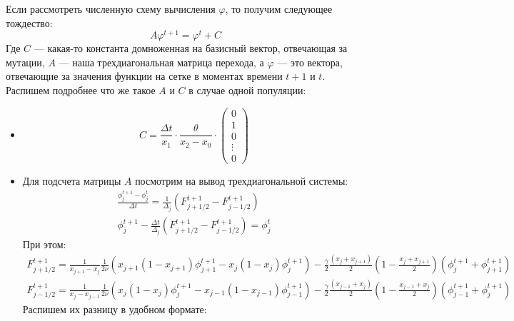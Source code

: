 \documentclass[10pt]{article}
\theoremstyle{plain}
\theoremstyle{remark}
\begin{document}
\begin{itemize}
  Если рассмотреть численную схему вычисления $\varphi$, то получим следующее тождество:
  \begin{equation*}
    A \varphi^{t + 1} = \varphi^t + C
  \end{equation*}
  Где $C$ --- какая-то константа домноженная на базисный вектор, отвечающая за мутации, $A$ --- наша трехдиагональная матрица перехода, а $\varphi$ --- это 
  вектора, отвечающие за значения функции на сетке в моментах времени $t + 1$ и $t$. Распишем подробнее что же такое $A$ и $C$ в случае одной популяции:
  \begin{itemize}
    \item
    \begin{equation*}
      C = \frac{\Delta t}{x_1} \cdot \frac{\theta}{x_2 - x_0} \cdot 
      \begin{pmatrix*}
        0 \\
        1 \\
        0 \\
        \vdots \\
        0
      \end{pmatrix*}
    \end{equation*}
    \item Для подсчета матрицы $A$ посмотрим на вывод трехдиагональной системы:
    \begin{gather*}
      \frac{\phi^{t + 1}_j - \phi^t_j}{\Delta t} = \frac{1}{\Delta_j}\left(F^{t + 1}_{j + 1/2} - F^{t + 1}_{j - 1/2}\right) \\ 
      \phi_j^{t + 1} - \frac{\Delta t}{\Delta_j} \left(F^{t + 1}_{j + 1/2} - F^{t + 1}_{j - 1/2}\right) = \phi_j^t
    \end{gather*}
    При этом:
    \begin{gather*}
      F^{t + 1}_{j + 1/2} = \frac{1}{x_{j + 1} - x_j} \frac{1}{2 \nu} \left(x_{j + 1}(1 - x_{j + 1}) \phi^{t + 1}_{j + 1} - x_j(1 - x_j) \phi^{t + 1}_j\right) 
      - \frac{\gamma}{2}\frac{(x_j + x_{j + 1})}{2} \left(1 - \frac{x_j + x_{j + 1}}{2}\right) (\phi_j^{t + 1} + \phi_{j + 1}^{t + 1})
      \\
      F^{t + 1}_{j - 1/2} = \frac{1}{x_{j} - x_{j - 1}} \frac{1}{2 \nu} \left(x_{j}(1 - x_{j}) \phi^{t + 1}_{j} - x_{j - 1}(1 - x_{j - 1}) \phi^{t + 1}_{j - 1}\right) 
      - \frac{\gamma}{2}\frac{(x_{j - 1} + x_{j})}{2} \left(1 - \frac{x_{j - 1} + x_{j}}{2}\right) (\phi_{j - 1}^{t + 1} + \phi_{j}^{t + 1})
    \end{gather*}
    Распишем их разницу в удобном формате:
    \begin{align*}

\end{align*}
\end{itemize}
\end{itemize}
\end{document}
